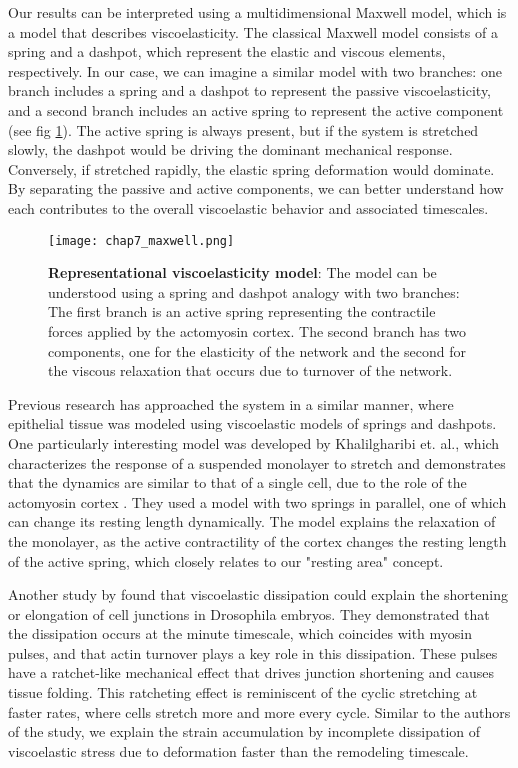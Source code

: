 Our results can be interpreted using a multidimensional Maxwell model,
which is a model that describes viscoelasticity. The classical Maxwell
model consists of a spring and a dashpot, which represent the elastic
and viscous elements, respectively. In our case, we can imagine a
similar model with two branches: one branch includes a spring and a
dashpot to represent the passive viscoelasticity, and a second branch
includes an active spring to represent the active component (see fig
\ref{fig_7_9}). The active spring is always present, but if the system is
stretched slowly, the dashpot would be driving the dominant mechanical
response. Conversely, if stretched rapidly, the elastic spring
deformation would dominate. By separating the passive and active
components, we can better understand how each contributes to the overall
viscoelastic behavior and associated timescales.

\begin{figure}
	\centering
	\texttt{[image: chap7\_maxwell.png]}
	\caption{\label{fig_7_9} \textbf{Representational viscoelasticity model}: The model can be understood using a spring and dashpot analogy with two branches: The first branch is an active spring representing the contractile forces applied by the actomyosin cortex. The second branch has two components, one for the elasticity of the network and the second for the viscous relaxation that occurs due to turnover of the network.
	}
\end{figure}

Previous research has approached the system in a similar manner, where
epithelial tissue was modeled using viscoelastic models of springs and
dashpots. One particularly interesting model was developed by
Khalilgharibi et. al., which characterizes the response of a suspended
monolayer to stretch and demonstrates that the dynamics are similar to
that of a single cell, due to the role of the actomyosin cortex
\cite{khalilgharibi2019}. They used a model with two springs in
parallel, one of which can change its resting length dynamically. The
model explains the relaxation of the monolayer, as the active
contractility of the cortex changes the resting length of the active
spring, which closely relates to our "resting area" concept.

Another study by \cite{clement2017} found that viscoelastic
dissipation could explain the shortening or elongation of cell junctions
in Drosophila embryos. They demonstrated that the dissipation occurs at
the minute timescale, which coincides with myosin pulses, and that actin
turnover plays a key role in this dissipation. These pulses have a
ratchet-like mechanical effect that drives junction shortening and
causes tissue folding. This ratcheting effect is reminiscent of the
cyclic stretching at faster rates, where cells stretch more and more
every cycle. Similar to the authors of the study, we explain the strain
accumulation by incomplete dissipation of viscoelastic stress due to
deformation faster than the remodeling timescale.

